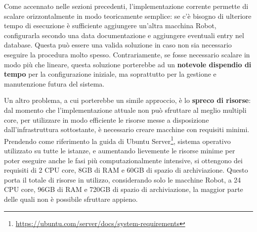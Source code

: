 Come accennato nelle sezioni precedenti, l'implementazione corrente permette di scalare
orizzontalmente in modo teoricamente semplice: se c'è bisogno di ulteriore tempo
di esecuzione è sufficiente aggiungere un'altra macchina Robot, configurarla secondo
una data documentazione e aggiungere eventuali entry nel database. Questa può
essere una valida soluzione in caso non sia necessario eseguire la procedura
molto spesso. Contrariamente, se fosse necessario scalare in modo più che
lineare, questa soluzione porterebbe ad un \textbf{notevole dispendio di tempo}
per la configurazione iniziale, ma soprattutto per la gestione e manutenzione futura
del sistema.

Un altro problema, a cui porterebbe un simile approccio, è lo \textbf{spreco di
risorse}: dal momento che l'implementazione attuale non può sfruttare al meglio multipli
core, per utilizzare in modo efficiente le risorse messe a disposizione dall'infrastruttura
sottostante, è necessario creare macchine con requisiti minimi. Prendendo come
riferimento la guida di Ubuntu Server\footnote{\url{https://ubuntu.com/server/docs/system-requirements}},
sistema operativo utilizzato su tutte le istanze, e aumentando lievemente le risorse
minime per poter eseguire anche le fasi più computazionalmente intensive, si
ottengono dei requisiti di 2 CPU core, 8GB di RAM e 60GB di spazio di archiviazione.
Questo porta il totale di risorse in utilizzo, considerando solo le macchine Robot,
a 24 CPU core, 96GB di RAM e 720GB di spazio di archiviazione, la maggior parte
delle quali non è possibile sfruttare appieno.